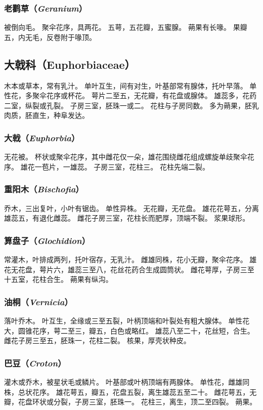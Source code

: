 \documentclass[11pt]{article}
\begin{document}
\begin{sloppypar}
\subsubsection{老鹳草（\textit{Geranium}）}
被倒向毛。
聚伞花序，具两花。
五萼，五花瓣，五蜜腺。
蒴果有长喙。
果瓣五，内无毛，反卷附于喙顶。

\subsection{大戟科（Euphorbiaceae）}
木本或草本，常有乳汁。
单叶互生，间有对生，叶基部常有腺体，托叶早落。
单性花，多聚伞花序或杯花。
萼片二至五，无花瓣，有花盘或腺体。
雄蕊多，花药二室，纵裂或孔裂。
子房三室，胚珠一或二。
花柱与子房同数。
多为蒴果，胚乳肉质，胚直生，种阜发达。

\subsubsection{大戟（\textit{Euphorbia}）}
无花被。
杯状或聚伞花序，其中雌花仅一朵，雄花围绕雌花组成螺旋单歧聚伞花序。
雄花一苞片，一雄蕊。
子房三室，花柱三。
花柱先端二裂。

\subsubsection{重阳木（\textit{Bischofia}）}
乔木，三出复叶，小叶有锯齿。
单性异株。
无花瓣，无花盘。
雄花花萼五，分离雄蕊五，有退化雌蕊。
雌花子房三室，花柱长而肥厚，顶端不裂。
浆果球形。

\subsubsection{算盘子（\textit{Glochidion}）}
常灌木，叶排成两列，托叶宿存，无乳汁。
雌雄同株，花小无瓣，聚伞花序。
雄花无花盘，萼片六，雄蕊三至八，花丝花药合生成圆筒状。
雌花萼厚，子房三至十五室，花柱合生。
蒴果有纵沟。

\subsubsection{油桐（\textit{Vernicia}）}
落叶乔木。
叶互生，全缘或三至五裂，叶柄顶端和叶裂处有粗大腺体。
单性花大，圆锥花序，萼二至三，瓣五，白色或略红。
雄蕊八至二十，花丝短，合生。
雌花子房三至五，胚珠一，花柱二裂。
核果，厚壳状种皮。

\subsubsection{巴豆（\textit{Croton}）}
灌木或乔木，被星状毛或鳞片。
叶基部或叶柄顶端有两腺体。
单性花，雌雄同株，总状花序。
雄花萼五，瓣五，花盘五裂，离生雄蕊五至二十。
雌花萼五，无瓣，花盘环状或分裂，子房三室，胚珠一。
花柱三，离生，顶二至四裂。
蒴果。


\end{sloppypar}
\end{document}
